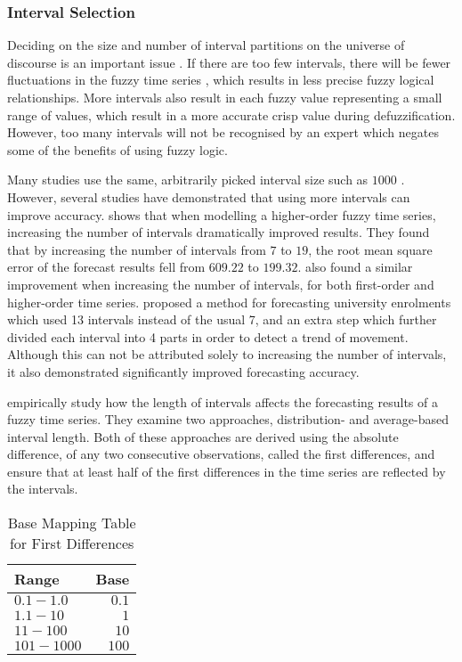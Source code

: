 \documentclass{article}
\theoremstyle{definition}
\begin{document}
\subsubsection{Interval Selection}

Deciding on the size and number of interval partitions on the universe of discourse is an important issue \citep{Huarng2001effective,  huarng2006ratio}. If there are too few intervals, there will be fewer fluctuations in the fuzzy time series \citep{Huarng2001effective}, which results in less precise fuzzy logical relationships. More intervals also result in each fuzzy value representing a small range of values, which result in a more accurate crisp value during defuzzification. However, too many intervals will not be recognised by an expert which negates some of the benefits of using fuzzy logic.

Many studies use the same, arbitrarily picked interval size such as $1000$ \citep{song1993forecasting, song1994forecasting, chen1996forecasting, tsai2000forecasting, chen2004new}. However, several studies have demonstrated that using more intervals can improve accuracy. \citep{tsai2000forecasting} shows that when modelling a higher-order fuzzy time series, increasing the number of intervals dramatically improved results. They found that by increasing the number of intervals from $7$ to $19$, the root mean square error of the forecast results fell from $609.22$ to $199.32$. \cite{tsai1999study} also found a similar improvement when increasing the number of intervals, for both first-order and higher-order time series. \cite{chen2004new} proposed a method for forecasting university enrolments which used 13 intervals instead of the usual 7, and an extra step which further divided each interval into 4 parts in order to detect a trend of movement. Although this can not be attributed solely to increasing the number of intervals, it also demonstrated significantly improved forecasting accuracy. 	

\cite{Huarng2001effective} empirically study how the length of intervals affects the forecasting results of a fuzzy time series. They examine two approaches, distribution- and average-based interval length. Both of these approaches are derived using the absolute difference, of any two consecutive observations, called the first differences, and ensure that at least half of the first differences in the time series are reflected by the intervals. 

\begin{table}[H]
	\center
	\begin{tabularx}{0.5\textwidth}{ X R }
  	Range & Base \\
  	\hline 
  	\noalign{\smallskip}
  	$0.1-1.0$ & $0.1$ \\
  	$1.1-10$ & $1$ \\
  	$11-100$ & $10$ \\
  	$101-1000$ & $100$ \\
	\end{tabularx}
	\caption{Base Mapping Table for First Differences}
\end{table}
\end{document}
